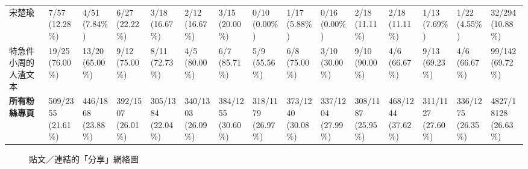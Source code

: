 \documentclass[a4paper, 10pt, conference]{ieeeconf}       %
\begin{document}
\begin{CJK}{UTF8}{bsmi}
\begin{landscape}
\begin{longtable}[c]{@{}L{2.45cm}L{1.1cm}L{1.1cm}L{1.1cm}L{1.1cm}L{1.1cm}L{1.1cm}L{1.1cm}L{1.1cm}L{1.1cm}L{1.1cm}L{1.1cm}L{1.1cm}L{1.1cm}L{1.1cm}@{}}
\fi
宋楚瑜 & 7/57 (12.28\%) & 4/51 (7.84\%) & 6/27 (22.22\%) & 3/18 (16.67\%) & 2/12 (16.67\%) & 3/15 (20.00\%) & 0/10 (0.00\%) & 1/17 (5.88\%) & 0/16 (0.00\%) & 2/18 (11.11\%) & 2/18 (11.11\%) & 1/13 (7.69\%) & 1/22 (4.55\%) & 32/294 (10.88\%) \\
特急件小周的人渣文本 & 19/25 (76.00\%) & 13/20 (65.00\%) & 9/12 (75.00\%) & 8/11 (72.73\%) & 4/5 (80.00\%) & 6/7 (85.71\%) & 5/9 (55.56\%) & 6/8 (75.00\%) & 3/10 (30.00\%) & 9/10 (90.00\%) & 4/6 (66.67\%) & 9/13 (69.23\%) & 4/6 (66.67\%) & 99/142 (69.72\%) \\
{\bfseries 所有粉絲專頁} & 509/2355 (21.61\%) & 446/1868 (23.88\%) & 392/1507 (26.01\%) & 305/1384 (22.04\%) & 340/1303 (26.09\%) & 384/1255 (30.60\%) & 318/1179 (26.97\%) & 373/1240 (30.08\%) & 337/1204 (27.99\%) & 308/1187 (25.95\%) & 468/1244 (37.62\%) & 311/1127 (27.60\%) & 336/1275 (26.35\%) & 4827/18128 (26.63\%) \\* \bottomrule
\end{longtable}
\end{landscape}

\begin{figure}[!htbp]
%
\caption{貼文／連結的「分享」網絡圖}
\label{f4}
\end{figure}


\end{CJK}
\end{document}
